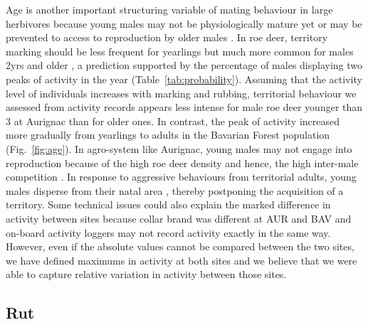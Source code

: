 \documentclass[a4paper,11pt]{article}
\begin{document}
Age is another important structuring variable of mating behaviour in large herbivores because young males may not be physiologically mature yet or may be prevented to access to reproduction by older males \citep{clutton-brock_red_1982}. In roe deer, territory marking should be less frequent for yearlings but much more common for males 2yrs and older \citep{johansson_functional_1996}, a prediction supported by the percentage of males displaying two peaks of activity in the year (Table~\ref{tab:probability}). Assuming that the activity level of individuals increases with marking and rubbing, territorial behaviour we assessed from activity records appears less intense for male roe deer younger than 3 at Aurignac than for older ones. In contrast, the peak of activity increased more gradually from yearlings to adults in the Bavarian Forest population (Fig.~\ref{fig:age}). In agro-system like Aurignac, young males may not engage into reproduction because of the high roe deer density and hence, the high inter-male competition \citep{hewison_using_2007}. In response to aggressive behaviours from territorial adults, young males disperse from their natal area \citep{wahlstrom_patterns_1995}, thereby postponing the acquisition of a territory. Some technical issues could also explain the marked difference in activity between sites because collar brand was different at AUR and BAV and on-board activity loggers may not record activity exactly in the same way. However, even if the absolute values cannot be compared between the two sites, we have defined maximums in activity at both sites and we believe that we were able to capture relative variation in activity between those sites.


\subsection*{Rut}
\end{document}

